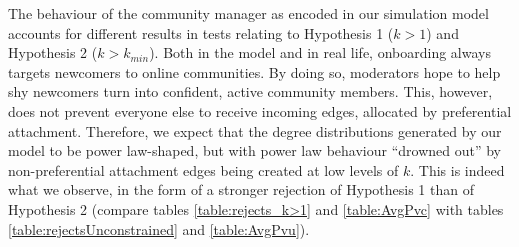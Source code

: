 \documentclass{bmcart}
\begin{document}
The behaviour of the community manager as encoded in our simulation model accounts for different results in tests relating to Hypothesis 1 ($k > 1$) and Hypothesis 2 ($k > k_{min}$). Both in the model and in real life, onboarding always targets newcomers to online communities. By doing so, moderators hope to help shy newcomers turn into confident, active community members. This, however, does not prevent everyone else to receive incoming edges, allocated by preferential attachment. Therefore, we expect that the degree distributions generated by our model to be power law-shaped, but with power law behaviour ``drowned out'' by non-preferential attachment edges being created at low levels of $k$. This is indeed what we observe, in the form of a stronger rejection of Hypothesis 1 than of Hypothesis 2 (compare tables \ref{table:rejects_k>1} and \ref{table:AvgPvc} with tables \ref{table:rejectsUnconstrained} and \ref{table:AvgPvu}). 




\end{document}
